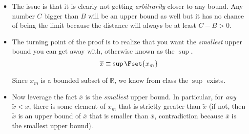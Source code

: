 \documentclass{article}
\begin{document}
\begin{enumerate}
\begin{itemize}[label=$\circ$]
\begin{figure}[H]
        \end{figure}

      \item The issue is that it is clearly not getting \textit{arbitrarily} closer to any bound. Any number $C$ bigger than $B$ will be an upper bound as well but it has no chance of being the limit because the distance will always be at least $C - B > 0$.

      \item The turning point of the proof is to realize that you want the \textit{smallest} upper bound you can get away with, otherwise known as the $\sup$.
        \begin{align*}
          \overline{x} \equiv \sup \Fset{x_m}
        \end{align*}

        Since $x_m$ is a bounded subset of $\mathbb{R}$, we know from class the $\sup$ exists.

      \item Now leverage the fact $\overline{x}$ is the \textit{smallest} upper bound. In particular, for \textit{any} $\widetilde{x} < \overline{x}$, there is some element of $x_m$ that is strictly greater than $\widetilde{x}$ (if not, then $\widetilde{x}$ is an upper bound of $\overline{x}$ that is smaller than $\overline{x}$, contradiction because $\overline{x}$ is the smallest upper bound).


\end{itemize}
\end{enumerate}
\end{document}
